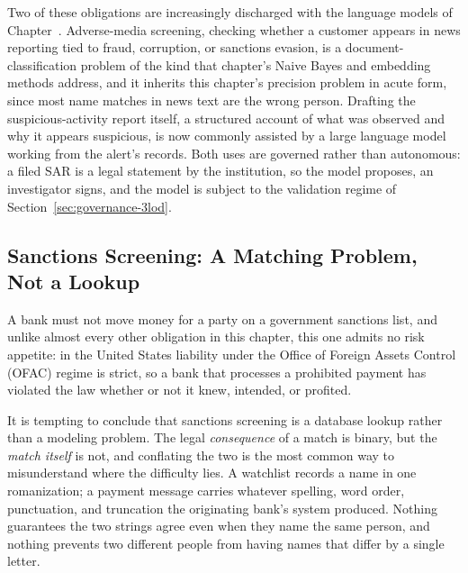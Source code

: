 \documentclass[../ai_in_finance]{subfiles}
\begin{document}
Two of these obligations are increasingly discharged with the language models of Chapter~. Adverse-media screening, checking whether a customer appears in news reporting tied to fraud, corruption, or sanctions evasion, is a document-classification problem of the kind that chapter's Naive Bayes and embedding methods address, and it inherits this chapter's precision problem in acute form, since most name matches in news text are the wrong person. Drafting the suspicious-activity report itself, a structured account of what was observed and why it appears suspicious, is now commonly assisted by a large language model working from the alert's records. Both uses are governed rather than autonomous: a filed SAR is a legal statement by the institution, so the model proposes, an investigator signs, and the model is subject to the validation regime of Section~\ref{sec:governance-3lod}.

\subsection{Sanctions Screening: A Matching Problem, Not a Lookup}
\label{sec:sanctions-screening}

A bank must not move money for a party on a government sanctions list, and unlike almost every other obligation in this chapter, this one admits no risk appetite: in the United States liability under the Office of Foreign Assets Control (OFAC) regime is strict, so a bank that processes a prohibited payment has violated the law whether or not it knew, intended, or profited.

It is tempting to conclude that sanctions screening is a database lookup rather than a modeling problem. The legal \emph{consequence} of a match is binary, but the \emph{match itself} is not, and conflating the two is the most common way to misunderstand where the difficulty lies. A watchlist records a name in one romanization; a payment message carries whatever spelling, word order, punctuation, and truncation the originating bank's system produced. Nothing guarantees the two strings agree even when they name the same person, and nothing prevents two different people from having names that differ by a single letter.
\end{document}
